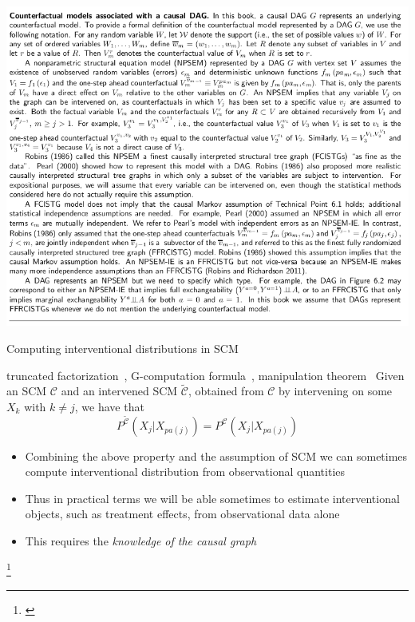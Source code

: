 \documentclass{beamer}
\newcommand\blfootnote[1]{%
  \begingroup
  \renewcommand\thefootnote{}\footnote{#1}%
  \addtocounter{footnote}{-1}%
  \endgroup
}
\begin{document}
\begin{frame}

\includegraphics[scale=0.4]{images/dagcon}
\end{frame}

\begin{frame}{Computing interventional distributions in SCM}
	\begin{block}{\small truncated factorization~\citep{pearl1993belief}, 
		G-computation formula~\citep{robins1986new}, 
		manipulation theorem~\citep{spirtes2000causation}}
		Given an SCM $\mathcal{C}$ and an intervened SCM $\tilde{\mathcal{C}}$, obtained 
		from $\mathcal{C}$ by intervening on some $X_k$ with $k \neq j$, we have that 
		\[P^{\tilde{\mathcal{C}}}(X_j |  X_{pa(j)}) = P^{\mathcal{C}}(X_j | X_{pa(j)})\]

	\end{block}
	\begin{itemize}
		\item<1-> Combining the above property and the assumption of SCM we can sometimes
			compute interventional distribution from observational quantities 
		\item<2-> Thus in practical terms we will be able sometimes to 
			estimate interventional objects, such as treatment effects, from 
			observational data alone
		\item<3-> This requires the \emph{knowledge of the causal graph} 
	\end{itemize}

	\blfootnote{\citet{peters2017elements}}
\end{frame}
\end{document}
